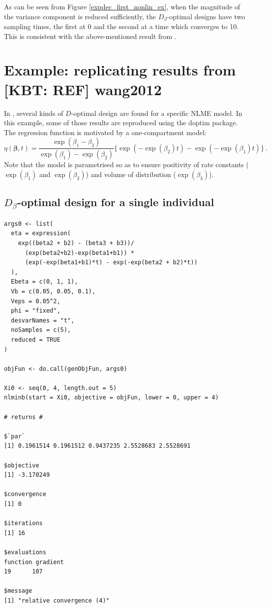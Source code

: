 \documentclass{article}
\newcommand*{\bbeta}{\boldsymbol \beta}
\theoremstyle{example}
\begin{document}
	As can be seen from Figure \ref{expdec_first_nonlin_ex}, when the magnitude of the variance component is reduced sufficiently, the $D_\beta$-optimal designs have two sampling times, the first at 0 and the second at a time which converges to 10.
	This is consistent with the above-mentioned result from \cite{Kitsos2013}.
	
	\newpage
	
	\section[Replicating Wang2012]{Example: replicating results from [KBT: REF] wang2012}
	
	In \cite{Wang2012}, several kinds of $D$-optimal design are found for a specific NLME model.
	In this example, some of those results are reproduced using the \textsf{doptim} package.
	The regression function is motivated by a one-compartment model:
	\[
	\eta(\bbeta , t) = \frac{\exp(\beta_1 - \beta_3)}{\exp(\beta_1)-\exp(\beta_2)} \{ \exp(- \exp(\beta_2) t) - \exp(-\exp(\beta_1) t)\} \ .
	\]
	Note that the model is parametrised so as to ensure positivity of rate constants ($\exp(\beta_1)$ and $\exp(\beta_2)$) and volume of distribution ($\exp(\beta_3)$).

\subsection{$D_\beta$-optimal design for a single individual}

\begin{verbatim}
args0 <- list(
  eta = expression(
    exp((beta2 + b2) - (beta3 + b3))/
      (exp(beta2+b2)-exp(beta1+b1)) *
      (exp(-exp(beta1+b1)*t) - exp(-exp(beta2 + b2)*t))
  ),
  Ebeta = c(0, 1, 1),
  Vb = c(0.05, 0.05, 0.1),
  Veps = 0.05^2,
  phi = "fixed",
  desvarNames = "t",
  noSamples = c(5),
  reduced = TRUE
)

objFun <- do.call(genObjFun, args0)

Xi0 <- seq(0, 4, length.out = 5)
nlminb(start = Xi0, objective = objFun, lower = 0, upper = 4)

# returns #

$`par`
[1] 0.1961514 0.1961512 0.9437235 2.5528683 2.5528691

$objective
[1] -3.170249

$convergence
[1] 0

$iterations
[1] 16

$evaluations
function gradient 
19      107 

$message
[1] "relative convergence (4)"
\end{verbatim}
\end{document}
